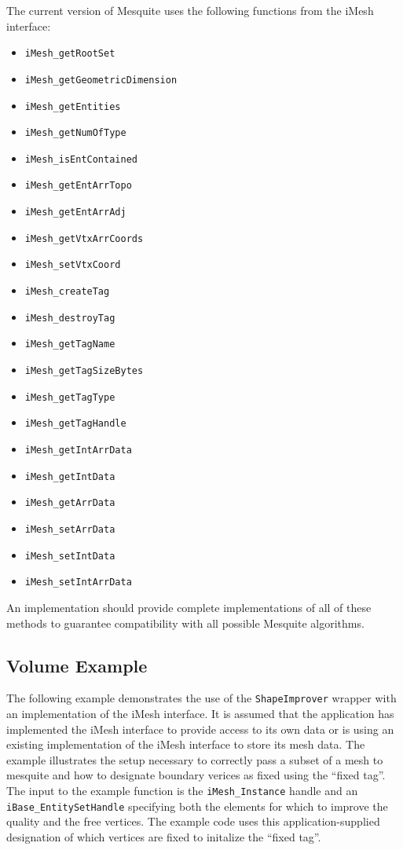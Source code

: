 The current version of Mesquite uses the following functions from the iMesh interface:
\begin{itemize}
\item \texttt{iMesh\_getRootSet}
\item \texttt{iMesh\_getGeometricDimension}
\item \texttt{iMesh\_getEntities}
\item \texttt{iMesh\_getNumOfType}
\item \texttt{iMesh\_isEntContained}
\item \texttt{iMesh\_getEntArrTopo}
\item \texttt{iMesh\_getEntArrAdj}
\item \texttt{iMesh\_getVtxArrCoords}
\item \texttt{iMesh\_setVtxCoord}
\item \texttt{iMesh\_createTag}
\item \texttt{iMesh\_destroyTag}
\item \texttt{iMesh\_getTagName}
\item \texttt{iMesh\_getTagSizeBytes}
\item \texttt{iMesh\_getTagType}
\item \texttt{iMesh\_getTagHandle}
\item \texttt{iMesh\_getIntArrData}
\item \texttt{iMesh\_getIntData}
\item \texttt{iMesh\_getArrData}
\item \texttt{iMesh\_setArrData}
\item \texttt{iMesh\_setIntData}
\item \texttt{iMesh\_setIntArrData}
\end{itemize}

An implementation should provide complete implementations of all of these methods to guarantee compatibility with all possible Mesquite algorithms. 

\subsection{Volume Example}

The following example demonstrates the use of the \texttt{ShapeImprover} wrapper with an implementation of the iMesh interface.  It is assumed that the application has implemented the iMesh interface to provide access to its own data or is using an existing implementation of the iMesh interface to store its mesh data.  The example illustrates the setup necessary to correctly pass a subset of a mesh to mesquite and how to designate boundary verices as fixed using the ``fixed tag''.  The input to the example function is the \texttt{iMesh\_Instance} handle and an \texttt{iBase\_EntitySetHandle} specifying both the elements for which to improve the quality and the free vertices.  The example code uses this application-supplied designation of which vertices are fixed to initalize the ``fixed tag''.

